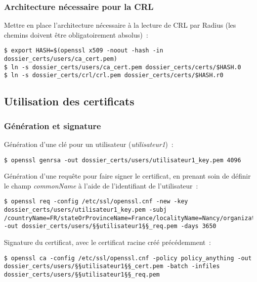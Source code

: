 \subsubsection{Architecture nécessaire pour la CRL}

Mettre en place l'architecture nécessaire à la lecture de CRL par Radius (les chemins doivent être obligatoirement absolus)~:

\begin{lstlisting}
$ export HASH=$(openssl x509 -noout -hash -in dossier_certs/users/ca_cert.pem)
$ ln -s dossier_certs/users/ca_cert.pem dossier_certs/certs/$HASH.0
$ ln -s dossier_certs/crl/crl.pem dossier_certs/certs/$HASH.r0
\end{lstlisting}

\subsection{Utilisation des certificats}
\subsubsection{Génération et signature}

Génération d'une clé pour un utilisateur (\emph{utilisateur1})~:

\begin{lstlisting}
$ openssl genrsa -out dossier_certs/users/utilisateur1_key.pem 4096
\end{lstlisting}

Génération d'une requête pour faire signer le certificat, en prenant soin de définir le champ \emph{commonName} à l'aide de l'identifiant de l'utilisateur~:

\begin{lstlisting}
$ openssl req -config /etc/ssl/openssl.cnf -new -key dossier_certs/users/utilisateur1_key.pem -subj /countryName=FR/stateOrProvinceName=France/localityName=Nancy/organizationName=BHConsulting/commonName=utilisateur1/ -out dossier_certs/users/§§utilisateur1§§_req.pem -days 3650
\end{lstlisting}

Signature du certificat, avec le certificat racine créé précédemment~:

\begin{lstlisting}
$ openssl ca -config /etc/ssl/openssl.cnf -policy policy_anything -out dossier_certs/users/§§utilisateur1§§_cert.pem -batch -infiles dossier_certs/users/§§utilisateur1§§_req.pem
\end{lstlisting}

